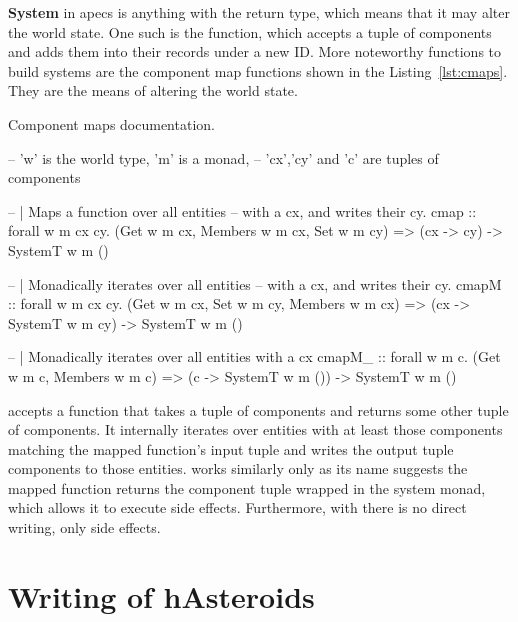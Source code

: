 \documentclass[
  digital, %
  color,   %
  table,   %
  oneside, %
  lof,     %
  lot,     %
]{fithesis3}
\begin{document}
\textbf{System} in apecs is anything with the  return type, which
means that it may alter the world state.
One such  is the  function, which
accepts a tuple of components and adds them into their records under a new ID.
More noteworthy functions to build systems are the component map functions
shown in the Listing~\ref{lst:cmaps}. They are the means of altering the world state.
\begin{listing}[H]
\caption{Component maps documentation.\cite{apecsdocs}}
\begin{haskell}
-- 'w' is the world type, 'm' is a monad,
-- 'cx','cy' and 'c' are tuples of components

-- | Maps a function over all entities
--   with a cx, and writes their cy.
cmap :: forall w m cx cy.
    (Get w m cx, Members w m cx, Set w m cy) =>
    (cx -> cy) -> SystemT w m ()

-- | Monadically iterates over all entities
--   with a cx, and writes their cy.
cmapM :: forall w m cx cy.
    (Get w m cx, Set w m cy, Members w m cx) =>
    (cx -> SystemT w m cy) -> SystemT w m ()

-- | Monadically iterates over all entities with a cx
cmapM_ :: forall w m c.
    (Get w m c, Members w m c) =>
    (c -> SystemT w m ()) -> SystemT w m ()
\end{haskell}
\label{lst:cmaps}
\end{listing}
 accepts a function that takes a tuple of components
and returns some other tuple of components. It internally iterates
over entities with at least those components matching the mapped
function's input tuple and writes the output tuple components
to those entities.  works similarly
only as its name suggests the mapped function returns the component
tuple wrapped in the system monad, which allows it to execute side effects.
Furthermore, with  there is no direct writing, only side effects.



\section{Writing of hAsteroids}
\end{document}
